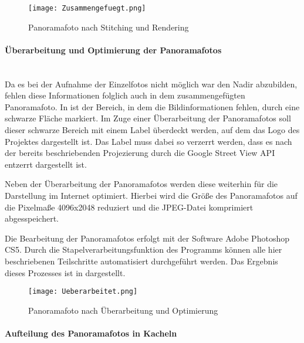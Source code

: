 \begin{figure}[htb]
\centering
\texttt{[image: Zusammengefuegt.png]}
\caption[Panoramafoto nach Stitching und Rendering]{Panoramafoto nach Stitching
und Rendering\protect\footnotemark}
\label{fig:Zusammengefuegt}
\end{figure}

\paragraph{Überarbeitung und Optimierung der Panoramafotos} \hfill \\

Da es bei der Aufnahme der Einzelfotos nicht möglich war den Nadir abzubilden,
fehlen diese Informationen folglich auch in dem zusammengefügten
Pa\-no\-ra\-ma\-fo\-to. In  ist der Bereich, in dem
die Bildinformationen fehlen, durch eine schwarze Fläche markiert. Im Zuge
einer Überarbeitung der Panoramafotos soll dieser schwarze Bereich mit einem
Label überdeckt werden, auf dem das Logo des Projektes dargestellt ist. Das
Label muss dabei so verzerrt werden, dass es nach der bereits beschriebenden
Projezierung durch die Google Street View API entzerrt dargestellt ist.

Neben der Überarbeitung der Panoramafotos werden diese weiterhin für die
Darstellung im Internet optimiert. Hierbei wird die Größe des Panoramafotos auf
die Pixelmaße 4096x2048 reduziert und die JPEG-Datei komprimiert abgesspeichert.

Die Bearbeitung der Panoramafotos erfolgt mit der Software Adobe Photoshop CS5.
Durch die Stapelverarbeitungsfunktion des Programms können alle hier
beschriebenen Teilschritte automatisiert durchgeführt werden. Das Ergebnis
dieses Prozesses ist in  dargestellt.

\begin{figure}[htb]
\centering
\texttt{[image: Ueberarbeitet.png]}
\caption[Panoramafoto nach Überarbeitung und Optimierung]{Panoramafoto nach
Überarbeitung und Optimierung\protect\footnotemark}
\label{fig:Ueberarbeitet}
\end{figure}

\paragraph{Aufteilung des Panoramafotos in Kacheln} \hfill \\

